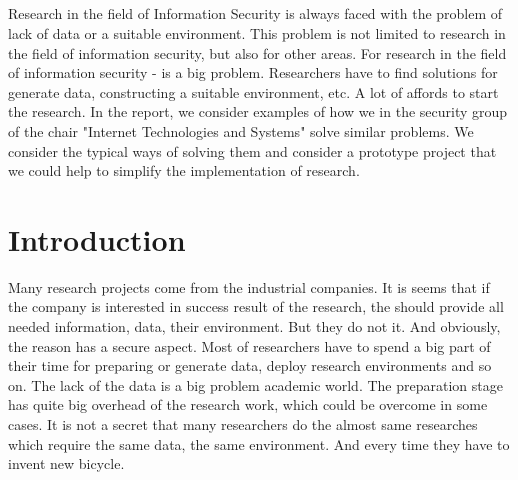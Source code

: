 \documentclass[twoside]{article}
\title{\vspace{-15mm}\fontsize{24pt}{10pt}\selectfont\textbf{\myArticleTitle}} %
\author{
\large
\textsc{\myAuthorName}\\
\normalsize \myUni \\ %
\normalsize \href{mailto:\myAuthorEmail}{\myAuthorEmail} %
\vspace{-10mm}
}
\date{}
\renewcommand{\abstractname}{} %
\renewenvironment{abstract}
 {\normalsize
  \begin{center}
  \end{center}
  \list{}{
    \setlength{\leftmargin}{.0cm}%
    \setlength{\rightmargin}{\leftmargin}%
  }%
  \item\relax}
 {\endlist}
\begin{document}
\large %

\maketitle %

\thispagestyle{fancy} %


\begin{abstract}

\noindent 
\large %
Research in the field of Information Security is always faced with the problem of lack of data or a suitable environment. This problem is not limited to research in the field of information security, but also for other areas. For research in the field of information security - is a big problem. Researchers have to find solutions for generate data, constructing a suitable environment, etc. A lot of affords to start the research. In the report, we consider examples of how we in the security group of the chair "Internet Technologies and Systems" solve similar problems. We consider the typical ways of solving them and consider a prototype project that we could help to simplify the implementation of research.

\end{abstract}



\section{Introduction}

Many research projects come from the industrial companies. It is seems that if the company is interested in success result of the research, the should provide all needed information, data, their environment. But they do not it. And obviously, the reason has a secure aspect. Most of researchers have to spend a big part of their time for preparing or generate data, deploy research environments and so on. The lack of the data is a big problem academic world. The preparation stage has quite big overhead of the research work, which could be overcome in some cases. It is not a secret that many researchers do the almost same researches which require the same data, the same environment. And every time they have to invent new bicycle. 
\end{document}
